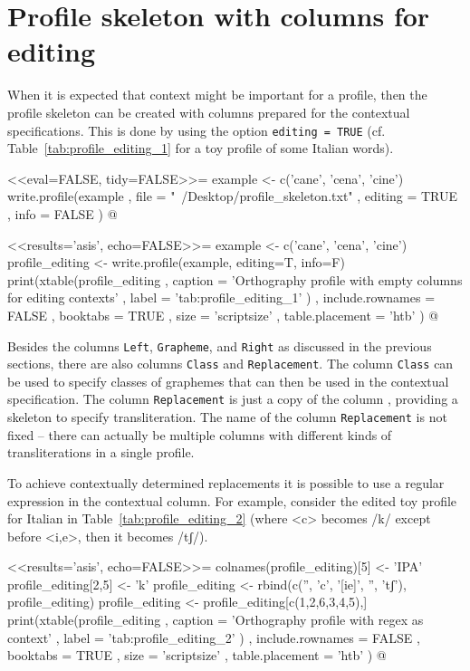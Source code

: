 \section{Profile skeleton with columns for editing}
\label{profile-editing}

When it is expected that context might be important for a profile, then the
profile skeleton can be created with columns prepared for the contextual
specifications. This is done by using the option \texttt{editing = TRUE} (cf.
Table~\ref{tab:profile_editing_1} for a toy profile of some Italian words).

<<eval=FALSE, tidy=FALSE>>=
example <- c('cane', 'cena', 'cine')
write.profile(example
              , file = "~/Desktop/profile_skeleton.txt"
              , editing = TRUE
              , info = FALSE
              )
@

<<results='asis', echo=FALSE>>=
example <- c('cane', 'cena', 'cine')
profile_editing <- write.profile(example, editing=T, info=F)
print(xtable(profile_editing
        , caption = 'Orthography profile with empty columns for editing contexts'
        , label = 'tab:profile_editing_1'
        )
  , include.rownames = FALSE
  , booktabs = TRUE
  , size = 'scriptsize'
  , table.placement = 'htb'
  )
@

Besides the columns \texttt{Left}, \texttt{Grapheme}, and \texttt{Right} as
discussed in the previous sections, there are also columns \texttt{Class} and
\texttt{Replacement}. The column \texttt{Class} can be used to specify classes
of graphemes that can then be used in the contextual specification. The column
\texttt{Replacement} is just a copy of the column , providing a
skeleton to specify transliteration. The name of the column
\texttt{Replacement} is not fixed -- there can actually be multiple columns with 
different kinds of transliterations in a single profile.

To achieve contextually determined replacements it is possible to use a regular
expression in the contextual column. For example, consider the edited toy
profile for Italian in Table~\ref{tab:profile_editing_2} (where <c> becomes /k/
except before <i,e>, then it becomes /tʃ/). 

<<results='asis', echo=FALSE>>=
colnames(profile_editing)[5] <- 'IPA'
profile_editing[2,5] <- 'k'
profile_editing <- rbind(c('', 'c', '[ie]', '', 'tʃ'), profile_editing)
profile_editing <- profile_editing[c(1,2,6,3,4,5),]
print(xtable(profile_editing
        , caption = 'Orthography profile with regex as context'
        , label = 'tab:profile_editing_2'
        )
  , include.rownames = FALSE
  , booktabs = TRUE
  , size = 'scriptsize'
  , table.placement = 'htb'
  )
@

